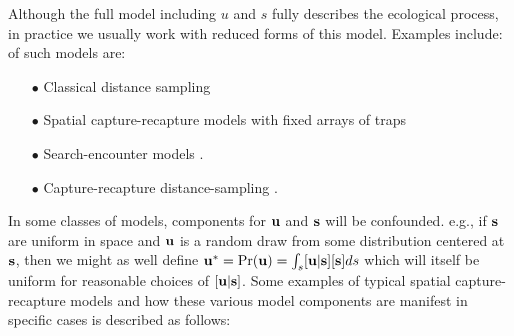 Although the full model including $u$ and $s$ fully describes the
ecological process, in practice we usually work with reduced forms of
this model. Examples include:
of such models are:
\begin{enumerate}
\item[$\bullet$] Classical distance sampling
\item[$\bullet$] Spatial capture-recapture models with fixed arrays of traps
  \citep{efford:2004, borchers_efford:2008, royle_etal:2009ecol,
    royle_etal:2009jae, gardner_etal:2010ecol,royle_etal:2011jwm}
\item[$\bullet$] Search-encounter models \citep{royle_young:2008, royle_etal:2011mee}.
\item[$\bullet$] Capture-recapture distance-sampling \citep{borchers_etal:1998}.
\end{enumerate}
In some classes of models, components for ${\bf u}$ and ${\bf s}$ will be confounded.
e.g., if ${\bf s}$ are uniform in space and ${\bf u}$ is
a random draw from some distribution centered at ${\bf s}$, then we might as
well define ${\bf u}^{*}=\Pr({\bf u})=\int_{s} [{\bf u}|{\bf s}][{\bf
  s}]ds$ which will itself be uniform
for reasonable choices of $[{\bf u}|{\bf s}]$.  Some examples
of typical spatial capture-recapture models and how
these various model components are manifest in specific cases is
described as follows:
